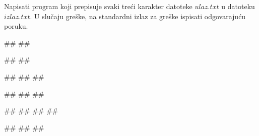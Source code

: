\begin{Exercise}[label=p3_02] 
Napisati program koji prepisuje svaki treći karakter datoteke $ulaz.txt$ u datoteku $izlaz.txt$.
U slučaju greške, na standardni izlaz za greške ispisati odgovarajuću poruku.

\begin{minitest}
\begin{upotreba}{1}
##
##

##
##
\end{upotreba}
\end{minitest}
\begin{minitest}
\begin{upotreba}{2}
##
##
##

##
##
##
\end{upotreba}
\end{minitest}
\begin{minitest}
\begin{upotreba}{3}
##
##
##
##

##
##
##
\end{upotreba}
\end{minitest}
\end{Exercise}
\begin{Answer}[ref=p3_02]
\end{Answer}


